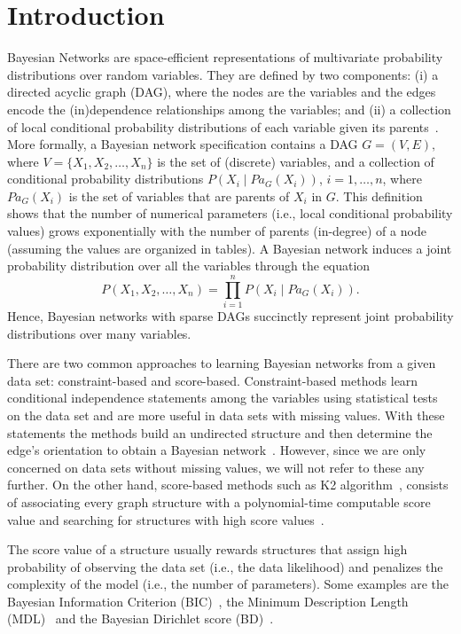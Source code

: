 \section{Introduction}
\label{sec:introduction}

Bayesian Networks are space-efficient representations of multivariate probability distributions over random variables. They are defined by two components: (i) a directed acyclic graph (DAG), where the
nodes are the variables and the edges encode the (in)dependence relationships among the variables; and (ii) a collection of local conditional probability distributions of each variable given its parents~\cite{VJensen01}. More formally, a Bayesian network specification contains a DAG \( G = ( V , E ), \) where $V = \{ X_1 , X_2 , \ldots , X_n \}$ is the set of (discrete) variables, and a collection of conditional probability distributions \( P( X_i \mid {Pa}_G( X_i ) ) \), $i=1,\ldots,n$, where ${Pa}_G( X_i )$ is the set of variables that are parents of $X_i$ in $G$. This definition shows that the number of numerical parameters (i.e., local conditional probability values) grows exponentially with the number of parents (in-degree) of a node (assuming the values are organized in tables). A Bayesian network induces a joint probability distribution over all the variables through the equation
	\begin{equation}
		\label{eq:jointdist}
		P( X_1 , X_2 , \ldots , X_n ) = \prod_{i=1}^{n} P( X_i \mid {Pa}_G( X_i ) ).
	\end{equation}
Hence, Bayesian networks with sparse DAGs succinctly represent joint probability distributions over many variables.

There are two common approaches to learning Bayesian networks from a given data set: constraint-based and score-based. Constraint-based methods learn conditional independence statements among the variables using statistical tests on the data set and are more useful in data sets with missing values. With these statements the methods build an undirected structure and then determine the edge's orientation to obtain a Bayesian network~\cite{Spirtes95}. However, since we are only concerned on data sets without missing values, we will not refer to these any further. On the other hand, score-based methods such as K2 algorithm~\cite{Cooper92}, consists of associating every graph structure with a polynomial-time computable score value and searching for structures with high score values~\cite{Margaritis03}.

The score value of a structure usually rewards structures that assign high probability of observing the data set (i.e., the data likelihood) and penalizes the complexity of the model (i.e., the number of parameters). Some examples are the Bayesian Information Criterion (BIC)~\cite{BIC91}, the Minimum Description Length (MDL)~\cite{MDL94} and the Bayesian Dirichlet score (BD)~\cite{BD95}.

